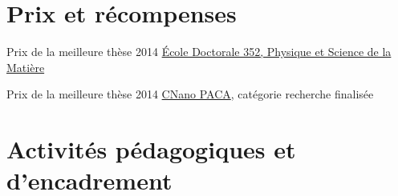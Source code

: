 \documentclass{cv}
\begin{document}


\vspace*{-0.2cm}
\section{Prix et récompenses}

 {Prix de la meilleure thèse 2014} {\href{https://ecole-doctorale-352.univ-amu.fr/en}{\'Ecole Doctorale 352, Physique et Science de la Matière}}

 {Prix de la meilleure thèse 2014 {\href{https://www.cnano-paca.fr/index.php?option=com_content&view=article&id=80}{CNano PACA}}, catégorie recherche finalisée}





\newpage

\section{Activités pédagogiques et d'encadrement}
\end{document}
